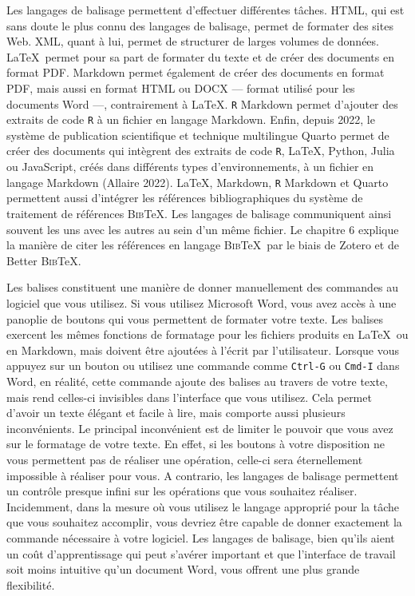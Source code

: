 \documentclass[
  letterpaper,
]{scrbook}
\begin{document}
Les langages de balisage permettent d'effectuer différentes tâches.
HTML, qui est sans doute le plus connu des langages de balisage, permet
de formater des sites Web. XML, quant à lui, permet de structurer de
larges volumes de données. \LaTeX~permet pour sa part de formater du
texte et de créer des documents en format PDF. Markdown permet également
de créer des documents en format PDF, mais aussi en format HTML ou DOCX
--- format utilisé pour les documents Word ---, contrairement à \LaTeX.
\texttt{R} Markdown permet d'ajouter des extraits de code \texttt{R} à
un fichier en langage Markdown. Enfin, depuis 2022, le système de
publication scientifique et technique multilingue Quarto permet de créer
des documents qui intègrent des extraits de code \texttt{R}, \LaTeX,
Python, Julia ou JavaScript, créés dans différents types
d'environnements, à un fichier en langage Markdown (Allaire 2022).
\LaTeX, Markdown, \texttt{R} Markdown et Quarto permettent aussi
d'intégrer les références bibliographiques du système de traitement de
références \textsc{Bib}\TeX. Les langages de balisage communiquent ainsi
souvent les uns avec les autres au sein d'un même fichier. Le chapitre 6
explique la manière de citer les références en langage
\textsc{Bib}\TeX~par le biais de Zotero et de Better \textsc{Bib}\TeX.

Les balises constituent une manière de donner manuellement des commandes
au logiciel que vous utilisez. Si vous utilisez Microsoft Word, vous
avez accès à une panoplie de boutons qui vous permettent de formater
votre texte. Les balises exercent les mêmes fonctions de formatage pour
les fichiers produits en \LaTeX~ou en Markdown, mais doivent être
ajoutées à l'écrit par l'utilisateur. Lorsque vous appuyez sur un bouton
ou utilisez une commande comme \texttt{Ctrl-G} ou \texttt{Cmd-I} dans
Word, en réalité, cette commande ajoute des balises au travers de votre
texte, mais rend celles-ci invisibles dans l'interface que vous
utilisez. Cela permet d'avoir un texte élégant et facile à lire, mais
comporte aussi plusieurs inconvénients. Le principal inconvénient est de
limiter le pouvoir que vous avez sur le formatage de votre texte. En
effet, si les boutons à votre disposition ne vous permettent pas de
réaliser une opération, celle-ci sera éternellement impossible à
réaliser pour vous. A contrario, les langages de balisage permettent un
contrôle presque infini sur les opérations que vous souhaitez réaliser.
Incidemment, dans la mesure où vous utilisez le langage approprié pour
la tâche que vous souhaitez accomplir, vous devriez être capable de
donner exactement la commande nécessaire à votre logiciel. Les langages
de balisage, bien qu'ils aient un coût d'apprentissage qui peut s'avérer
important et que l'interface de travail soit moins intuitive qu'un
document Word, vous offrent une plus grande flexibilité.
\end{document}
